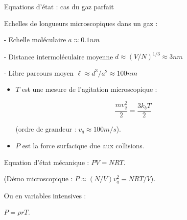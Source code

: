 \begin{frame}{Equations d'état : cas du gaz parfait}


Echelles de longueurs microscopiques dans un gaz :

- Echelle moléculaire $a \approx 0.1 nm$

- Distance intermoléculaire moyenne $d \approx (V/N)^{1/3} \approx 3 nm$

- Libre parcours moyen $\ell \approx d^3 / a^2  \approx 100 nm$ 


\begin{itemize}
\item 
$T$ est une mesure de l'agitation microscopique :

$$
 \frac{m v_q^2}{2} = \frac{3 k_b T}{2}
$$

(ordre de grandeur : $v_q \approx 100 m/s$). 

\item 
$P$ est la force surfacique due aux collisions.

\end{itemize}


Equation d'état mécanique : $PV =  NRT$.
 
 (Démo microscopique :  $P \approx (N/V) v_q^2 \equiv NRT/V$).
 
 \medskip

Ou en variables intensives :

$P = \rho r T$.

 
 
  
 
\end{frame}

